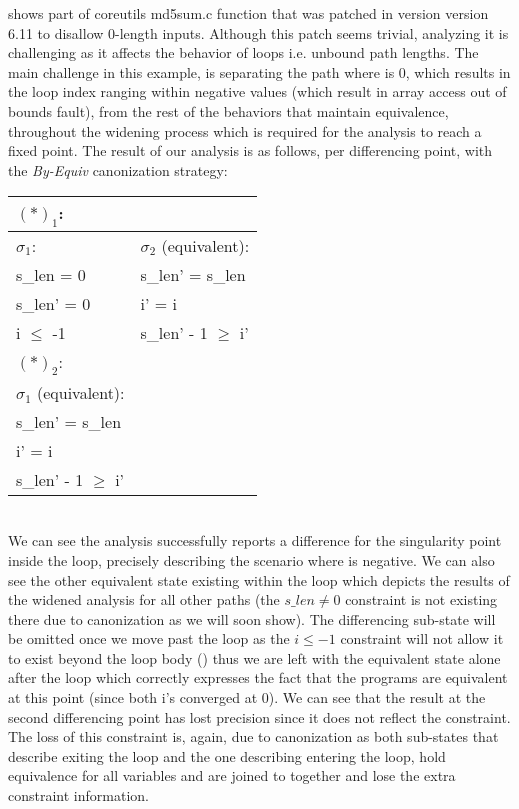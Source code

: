  shows part of coreutils md5sum.c  function that was patched in version version 6.11 to disallow 0-length inputs. Although this patch seems trivial, analyzing it is challenging as it affects the behavior of loops i.e. unbound path lengths. The main challenge in this example, is separating the path where  is 0, which results in the loop index  ranging within negative values (which result in array access out of bounds fault), from the rest of the behaviors that maintain equivalence, throughout the widening process which is required for the analysis to reach a fixed point. The result of our analysis is as follows, per differencing point, with the \emph{By-Equiv} canonization strategy:
\\
\begin{tabular}{l|l}
$(*)_1$:
\\ \hline
$\sigma_1$:     & $\sigma_2$ (equivalent):
\\ \hline
s\_len = 0      & s\_len' = s\_len
\\
s\_len' = 0     & i' = i 
\\
i $\leq$ -1     & s\_len' - 1 $\geq$ i'
\\ \hline
$(*)_2$:
\\ \hline
$\sigma_1$ (equivalent):
\\ \hline
s\_len' = s\_len
\\
i' = i
\\
s\_len' - 1 $\geq$ i'
\\ \hline
\end{tabular}
\\
We can see the analysis successfully reports a difference for the singularity point  inside the loop, precisely describing the scenario where  is negative. We can also see the other equivalent state existing within the loop which depicts the results of the widened analysis for all other paths (the $s\_len \neq 0$ constraint is not existing there due to canonization as we will soon show). The differencing sub-state will be omitted once we move past the loop as the $i \leq -1$ constraint will not allow it to exist beyond the loop body () thus we are left with the equivalent state alone after the loop which correctly expresses the fact that the programs are equivalent at this point (since both i's converged at 0). We can see that the result at the second differencing point has lost precision since it does not reflect the  constraint. The loss of this constraint is, again, due to canonization as both sub-states that describe exiting the loop and the one describing entering the loop, hold equivalence for all variables and are joined to together and lose the extra constraint information.
